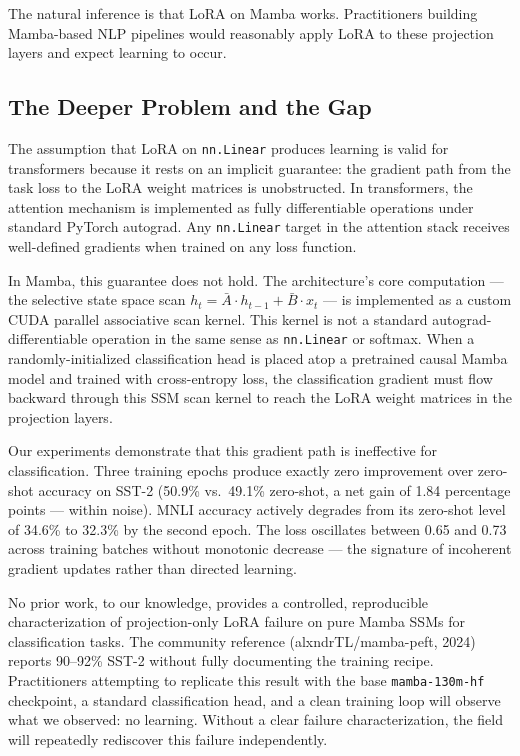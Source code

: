 The natural inference is that LoRA on Mamba works. Practitioners building Mamba-based NLP pipelines would reasonably apply LoRA to these projection layers and expect learning to occur.

\subsection{The Deeper Problem and the Gap}

The assumption that LoRA on \texttt{nn.Linear} produces learning is valid for transformers because it rests on an implicit guarantee: the gradient path from the task loss to the LoRA weight matrices is unobstructed. In transformers, the attention mechanism is implemented as fully differentiable operations under standard PyTorch autograd. Any \texttt{nn.Linear} target in the attention stack receives well-defined gradients when trained on any loss function.

In Mamba, this guarantee does not hold. The architecture's core computation --- the selective state space scan $h_t = \bar{A} \cdot h_{t-1} + \bar{B} \cdot x_t$ --- is implemented as a custom CUDA parallel associative scan kernel. This kernel is not a standard autograd-differentiable operation in the same sense as \texttt{nn.Linear} or softmax. When a randomly-initialized classification head is placed atop a pretrained causal Mamba model and trained with cross-entropy loss, the classification gradient must flow backward through this SSM scan kernel to reach the LoRA weight matrices in the projection layers.

Our experiments demonstrate that this gradient path is ineffective for classification. Three training epochs produce exactly zero improvement over zero-shot accuracy on SST-2 (50.9\% vs.\ 49.1\% zero-shot, a net gain of 1.84 percentage points --- within noise). MNLI accuracy actively degrades from its zero-shot level of 34.6\% to 32.3\% by the second epoch. The loss oscillates between 0.65 and 0.73 across training batches without monotonic decrease --- the signature of incoherent gradient updates rather than directed learning.

No prior work, to our knowledge, provides a controlled, reproducible characterization of projection-only LoRA failure on pure Mamba SSMs for classification tasks. The community reference (alxndrTL/mamba-peft, 2024) reports 90--92\% SST-2 without fully documenting the training recipe. Practitioners attempting to replicate this result with the base \texttt{mamba-130m-hf} checkpoint, a standard classification head, and a clean training loop will observe what we observed: no learning. Without a clear failure characterization, the field will repeatedly rediscover this failure independently.

